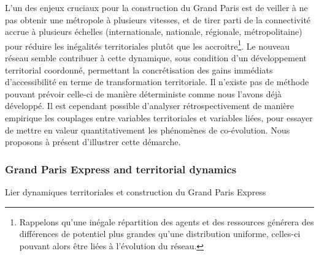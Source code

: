 L'un des enjeux cruciaux pour la construction du Grand Paris est de veiller à ne pas obtenir une métropole à plusieurs vitesses, et de tirer parti de la connectivité accrue à plusieurs échelles (internationale, nationale, régionale, métropolitaine) pour réduire les inégalités territoriales plutôt que les accroitre\footnote{Rappelons qu'une inégale répartition des agents et des ressources générera des différences de potentiel plus grandes qu'une distribution uniforme, celles-ci pouvant alors être liées à l'évolution du réseau.}. Le nouveau réseau semble contribuer à cette dynamique, sous condition d'un développement territorial coordonné, permettant la concrétisation des gains immédiats d'accessibilité en terme de transformation territoriale. Il n'existe pas de méthode pouvant prévoir celle-ci de manière déterministe comme nous l'avons déjà développé. Il est cependant possible d'analyser rétrospectivement de manière empirique les couplages entre variables territoriales et variables liées, pour essayer de mettre en valeur quantitativement les phénomènes de co-évolution. Nous proposons à présent d'illustrer cette démarche.






\subsubsection{Grand Paris Express and territorial dynamics}{Lier dynamiques territoriales et construction du Grand Paris Express}






